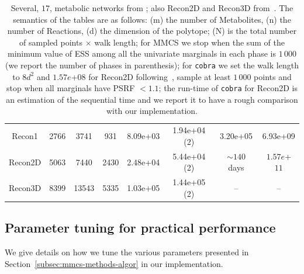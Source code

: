 \begin{table}[t]
\begin{tabular}{|c||c|c|c||c|c||c|c|}
      Recon1 & 2766 & 3741 & 931 & 8.09e+03 & 1.94e+04 (2) & 3.20e+05  & 6.93e+09 \\
      Recon2D & 5063 & 7440 & 2430 & 2.48e+04  &  5.44e+04 (2)  & $\sim 140$ days & $1.57e$+$11$   \\
      Recon3D  & 8399 & 13543 & 5335 & 1.03e+05 &  1.44e+05 (2) & -- & -- \\
      \hline
      \end{tabular}
      \caption[Recon2 and Recond3D distribution comparison]{\label{tab:results1} Several, $17$, metabolic networks from \cite{king2016bigg}; also  Recon2D and Recon3D from~\cite{Noronha18}.
         The semantics of the tables are as follows: (m) the number of Metabolites,
         (n) the number of Reactions, %
         (d) the dimension of the polytope; (N) is the total number of sampled
         points $\times$ walk length; for MMCS we stop when the sum of the minimum
         value of ESS among all the univariate marginals in each phase is $1\,000$
         (we report the number of phases in parenthesis); for \texttt{cobra} we set the
         walk length to $8d^2$ and $1.57e$+$08$ for Recon2D
         following~\cite{haraldsdottir2017chrr}, sample at least $1\,000$ points and
         stop when all marginals have PSRF $< 1.1$; the run-time of \texttt{cobra} for
         Recon2D is an estimation of the sequential time and we report it to have a
         rough comparison with our implementation.}
   \end{table}



 \subsection{Parameter tuning for practical performance}\label{subsec:implementation}

   We give details on how we tune the various parameters presented 
   in Section~\ref{subsec:mmcs-methods-algor} in our implementation.

